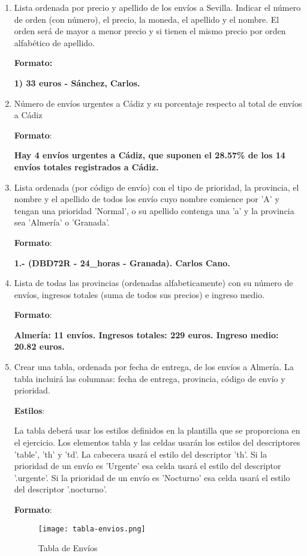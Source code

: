 \begin{enumerate}[label=\Alph*.]
    \item Lista ordenada por precio y apellido de los envíos a Sevilla. Indicar el número de orden (con número), el precio, la moneda, el apellido y el nombre. El orden será de mayor a menor precio y si tienen el mismo precio por orden alfabético de apellido.

    \textbf{Formato:}

    \textbf{1) 33 euros - Sánchez, Carlos.}

    \item Número de envíos urgentes a Cádiz y su porcentaje respecto al total de envíos a Cádiz

    \textbf{Formato}:

    \textbf{Hay 4 envíos urgentes a Cádiz, que suponen el 28.57\% de los 14 envíos totales registrados a Cádiz.}

    \item Lista ordenada (por código de envío) con el tipo de prioridad, la provincia, el nombre y el apellido de todos los envío cuyo nombre comience por 'A' y tengan una prioridad 'Normal', o su apellido contenga una 'a' y la provincia sea 'Almería' o 'Granada'.

    \textbf{Formato}:

    \textbf{1.- (DBD72R - 24\_horas - Granada). Carlos Cano.}

    \item Lista de todas las provincias (ordenadas alfabeticamente) con su número de envíos, ingresos totales (suma de todos sus precios) e ingreso medio.

    \textbf{Formato}:

    \textbf{Almería: 11 envíos. Ingresos totales: 229 euros. Ingreso medio: 20.82 euros.}

    \item Crear una tabla, ordenada por fecha de entrega, de los envíos a Almería. La tabla incluirá las columnas: fecha de entrega, provincia, código de envío y prioridad.

    \textbf{Estilos}:

    La tabla deberá usar los estilos definidos en la plantilla que se proporciona en el ejercicio. Los elementos tabla y las celdas usarán los estilos del descriptores 'table', 'th' y 'td'. La cabecera usará el estilo del descriptor 'th'. Si la prioridad de un envío es 'Urgente' esa celda usará el estilo del descriptor '.urgente'. Si la prioridad de un envío es 'Nocturno' esa celda usará el estilo del descriptor '.nocturno'.

    \textbf{Formato}:

    \begin{figure}[H]
        \centering
        \texttt{[image: tabla-envios.png]}
        \caption{Tabla de Envíos}
    \end{figure}
\end{enumerate}

